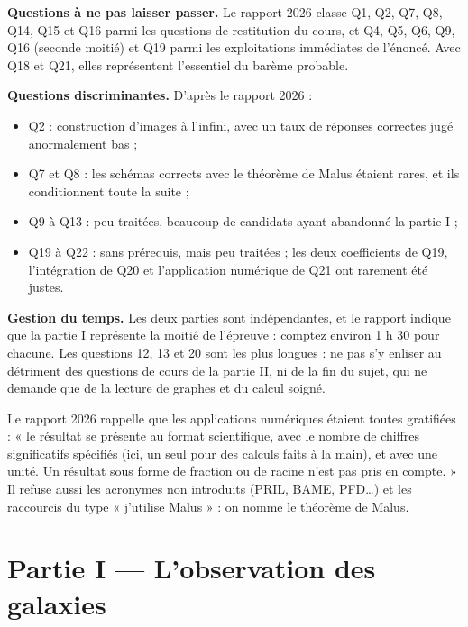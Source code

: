 \documentclass[11pt,a4paper]{article}
\providecommand{\tightlist}{\setlength{\itemsep}{0pt}\setlength{\parskip}{0pt}}
\begin{document}
\textbf{Questions à ne pas laisser passer.} Le rapport 2026 classe Q1, Q2, Q7, Q8, Q14, Q15 et Q16 parmi les questions de restitution du cours, et Q4, Q5, Q6, Q9, Q16 (seconde moitié) et Q19 parmi les exploitations immédiates de l'énoncé. Avec Q18 et Q21, elles représentent l'essentiel du barème probable.

\textbf{Questions discriminantes.} D'après le rapport 2026 :

\begin{itemize}
\tightlist
\item
  Q2 : construction d'images à l'infini, avec un taux de réponses correctes jugé anormalement bas ;
\item
  Q7 et Q8 : les schémas corrects avec le théorème de Malus étaient rares, et ils conditionnent toute la suite ;
\item
  Q9 à Q13 : peu traitées, beaucoup de candidats ayant abandonné la partie I ;
\item
  Q19 à Q22 : sans prérequis, mais peu traitées ; les deux coefficients de Q19, l'intégration de Q20 et l'application numérique de Q21 ont rarement été justes.
\end{itemize}

\textbf{Gestion du temps.} Les deux parties sont indépendantes, et le rapport indique que la partie I représente la moitié de l'épreuve : comptez environ 1 h 30 pour chacune. Les questions 12, 13 et 20 sont les plus longues : ne pas s'y enliser au détriment des questions de cours de la partie II, ni de la fin du sujet, qui ne demande que de la lecture de graphes et du calcul soigné.

\begin{jury}

Le rapport 2026 rappelle que les applications numériques étaient toutes gratifiées : « le résultat se présente au format scientifique, avec le nombre de chiffres significatifs spécifiés (ici, un seul pour des calculs faits à la main), et avec une unité. Un résultat sous forme de fraction ou de racine n'est pas pris en compte. » Il refuse aussi les acronymes non introduits (PRIL, BAME, PFD\ldots) et les raccourcis du type « j'utilise Malus » : on nomme le théorème de Malus.

\end{jury}

\hypertarget{partie-i-lobservation-des-galaxies}{%
\section{Partie I --- L'observation des galaxies}\label{partie-i-lobservation-des-galaxies}}
\end{document}
